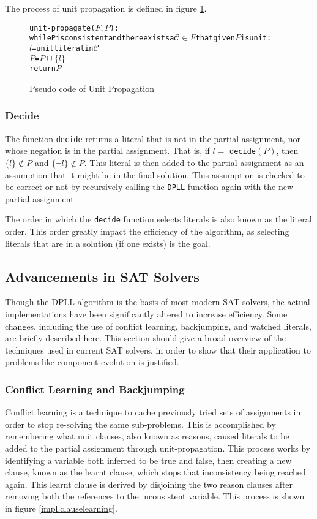 The process of unit propagation is defined in figure \ref{impl.propagation}.
\begin{figure}[htp]
\begin{center}
\begin{alltt}
unit-propagate(\(F, P\)):
  while P is consistent and there exists a \(\mathcal{C} \in F\) that given \(P\) is unit:
    \(l\) = unit literal in \(\mathcal{C}\)
    \(P\) = \(P \cup \{l\}\)
  return \(P\)
\end{alltt}
  \caption{Pseudo code of Unit Propagation}
  \label{impl.propagation}
\end{center}
\end{figure}

\subsubsection{Decide}
\label{impl.litorder}
The function \verb+decide+ returns a literal that is not in the partial assignment, nor whose negation is in the partial assignment.
That is, if $l =$ \verb+decide+$(P)$, then $\{l\} \not \in P$ and $\{\neg l\} \not \in P$.
This literal is then added to the partial assignment as an assumption that it might be in the final solution.
This assumption is checked to be correct or not by recursively calling the \texttt{DPLL} function again with the new partial assignment.

The order in which the \verb+decide+ function selects literals is also known as the literal order.
This order greatly impact the efficiency of the algorithm, as selecting literals that are in a solution (if one exists) is the goal.

\subsection{Advancements in SAT Solvers}
Though the DPLL algorithm is the basis of most modern SAT solvers, the actual implementations have been significantly altered to increase efficiency.
Some changes, including the use of conflict learning, backjumping, and watched literals, are briefly described here.
This section should give a broad overview of the techniques used in current SAT solvers, 
in order to show that their application to problems like component evolution is justified. 

\subsubsection{Conflict Learning and Backjumping}
Conflict learning \citep{stallman1976} is a technique to cache previously tried sets of assignments in order to stop re-solving the same sub-problems.
This is accomplished by remembering what unit clauses, also known as reasons, caused literals to be added to the partial assignment through unit-propagation. 
This process works by identifying a variable both inferred to be true and false,
then creating a new clause, known as the learnt clause, which stops that inconsistency being reached again.
This learnt clause is derived by disjoining the two reason clauses after removing both the references to the inconsistent variable.
This process is shown in figure \ref{impl.clauselearning}. 

